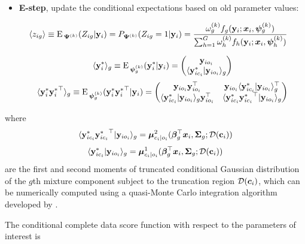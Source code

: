 \documentclass{interact}
\theoremstyle{plain}
\theoremstyle{definition}
\theoremstyle{remark}
\begin{document}
\begin{itemize}
    \item  \textbf{E-step}, update the conditional expectations based on old parameter values:
    
\begin{align}
    \langle z_{ig}\rangle &\equiv {\rm E}\,_{\bm{\Psi}^{(k)}}(Z_{ig}|\mathbf{y}_i)=P_{\bm{\Psi}^{(k)}}(Z_{ig}=1|\mathbf{y}_i)=\frac{\omega_g^{(k)}f_g(\mathbf{y}_i;\bm{x}_i,\bm{\psi}_g^{(k)})}{\sum_{h=1}^{G}\omega_h^{(k)}f_h(\mathbf{y}_i;\bm{x}_i,\bm{\psi}_h^{(k)})}
\end{align}
    
\begin{align}
    \langle {\mathbf{y}_i^*}\rangle_g\equiv {\rm E}\,_{\bm{\psi}_g^{(k)}}(\mathbf{y}_i^*|\mathbf{y}_i)=
    \begin{pmatrix}
                \mathbf{y}_{io_{i}}\\
                \langle \mathbf{y}_{ic_{i}}^*|\mathbf{y}_{io_{i}} \rangle_g
            \end{pmatrix}
    \end{align}
    \begin{align}
    \langle {\mathbf{y}_i^*{\mathbf{y}_i^*}^\top}\rangle_g\equiv {\rm E}\,_{\bm{\psi}_g^{(k)}}(\mathbf{y}_i^*{\mathbf{y}_i^*}^\top|\mathbf{y}_i)=
    \begin{pmatrix}
                \mathbf{y}_{io_{i}}\mathbf{y}_{io_{i}}^\top & \mathbf{y}_{io_{i}}\langle\mathbf{y}_{ic_{i}}^*|\mathbf{y}_{io_{i}}\rangle_g^\top\\
                \langle\mathbf{y}_{ic_{i}}^*|\mathbf{y}_{io_{i}}\rangle_g \mathbf{y}_{io_{i}}^\top & \langle \mathbf{y}_{ic_{i}}^* {\mathbf{y}_{ic_{i}}^*}^\top|\mathbf{y}_{io_{i}} \rangle_g
            \end{pmatrix}
\end{align}
\end{itemize}
where
\begin{align*}
    \langle \mathbf{y}_{ic_{i}}^* {\mathbf{y}_{ic_{i}}^*}^\top|\mathbf{y}_{io_{i}}\rangle_g
    =\boldsymbol{\mu}_{c_i|o_i}^2({{\bm \beta}_g^\top\bm{x}_i},\bm{\Sigma}_g; \mathcal{D}(\textbf{c}_i))
\end{align*}
\begin{align*}
    \langle \mathbf{y}_{ic_{i}}^*|\mathbf{y}_{io_{i}}\rangle_g
    =\boldsymbol{\mu}_{c_i|o_i}^1({{\bm \beta}_g^\top\bm{x}_i},\bm{\Sigma}_g; \mathcal{D}(\textbf{c}_i))
\end{align*}
are the first and second moments of truncated conditional Gaussian distribution of the $g$th mixture component subject to the truncation region $\mathcal{D}(\bm{c}_i)$, which can be numerically computed using a quasi-Monte Carlo integration algorithm developed by \citep{Genz2002,Genz2004}. 

The conditional complete data score function with respect to the parameters of interest is
\end{document}
